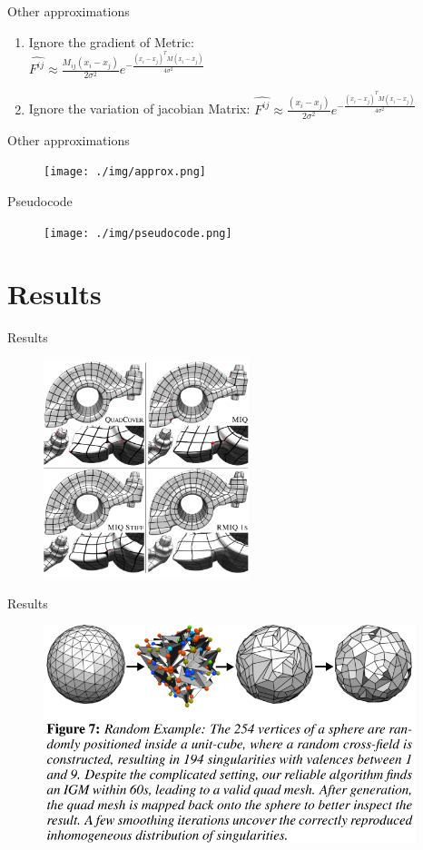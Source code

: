 \documentclass{beamer}
\begin{document}
\begin{frame}{Other approximations}
\begin{enumerate}
\item Ignore the gradient of Metric: \quad \\
  $\hat{F^{ij}}\approx\frac{M_{ij}(x_i-x_j)}{2\sigma^2}e^{-\frac{(x_i-x_j)^TM(x_i-x_j)}{4\sigma^2}}$
\item Ignore the variation of jacobian Matrix: \quad $\hat{F^{ij}}\approx\frac{(x_i-x_j)}{2\sigma^2}e^{-\frac{(x_i-x_j)^TM(x_i-x_j)}{4\sigma^2}}$
\end{enumerate}
\end{frame}

\begin{frame}{Other approximations}
\begin{figure}
\texttt{[image: ./img/approx.png]}
\end{figure}
\end{frame}

\begin{frame}{Pseudocode}
\begin{figure}
\centering
\texttt{[image: ./img/pseudocode.png]}
\end{figure}
\end{frame}

\section{Results}
\begin{frame}{Results}
\begin{figure}
\centering
\includegraphics[height=2.5in]{./img/result1.png}
\end{figure}
\end{frame}

\begin{frame}{Results}
\begin{figure}
\centering
\includegraphics[height=2.5in]{./img/result2.png}
\end{figure}
\end{frame}
\end{document}
